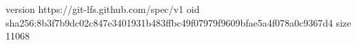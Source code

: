 version https://git-lfs.github.com/spec/v1
oid sha256:8b3f7b9dc02c847e3401931b483ffbc49f07979f9609bfae5a4f078a0c9367d4
size 11068
